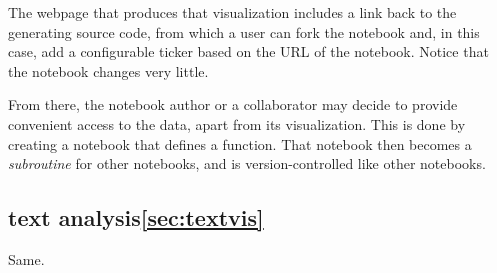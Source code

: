 The webpage that produces that visualization includes a link back to
the generating source code, from which a user can fork the notebook
and, in this case, add a configurable ticker based on the URL of
the notebook. Notice that the notebook changes very little.

From there, the notebook author or a collaborator may decide to
provide convenient access to the data, apart from its visualization.
This is done by creating a notebook that defines a function.
That notebook then becomes a \emph{subroutine} for other notebooks,
and is version-controlled like other notebooks.







\subsection{text analysis\ref{sec:textvis}}

Same.

%
